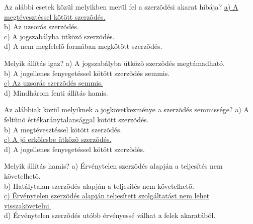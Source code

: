 \begin{frame}

\begin{tcolorbox}[title={156. Kérdés}]
Az alábbi esetek közül melyikben merül fel a szerzõdési akarat hibája?
\tcblower
\uline {a) A megtévesztéssel kötött szerzõdés.}\\
b) Az uzsorás szerzõdés.\\
c) A jogszabályba ütközõ szerzõdés.\\
d) A nem megfelelõ formában megkötött szerzõdés.
\end{tcolorbox}

\begin{tcolorbox}[title={157. Kérdés}]
Melyik állítás igaz?
\tcblower
a) A jogszabályba ütközõ szerzõdés megtámadható.\\
b) A jogellenes fenyegetéssel kötött szerzõdés semmis.\\
\uline {c) Az uzsorás szerzõdés semmis.}\\
d) Mindhárom fenti állítás hamis.
\end{tcolorbox}

\begin{tcolorbox}[title={158. Kérdés}]
Az alábbiak közül melyiknek a jogkövetkezménye a szerzõdés semmissége?
\tcblower
a) A feltûnõ értékaránytalansággal kötött szerzõdés.\\
b) A megtévesztéssel kötött szerzõdés.\\
\uline {c) A jó erkölcsbe ütközõ szerzõdés.}\\
d) A jogellenes fenyegetéssel kötött szerzõdés.
\end{tcolorbox}

\begin{tcolorbox}[title={159. Kérdés}]
Melyik állítás hamis?
\tcblower
a) Érvénytelen szerzõdés alapján a teljesítés nem követelhetõ.\\
b) Hatálytalan szerzõdés alapján a teljesítés nem követelhetõ.\\
\uline {c) Érvénytelen szerzõdés alapján teljesített szolgáltatást nem lehet visszakövetelni.}\\
d) Érvénytelen szerzõdés utóbb érvényessé válhat a felek akaratából.
\end{tcolorbox}

\end{frame}


